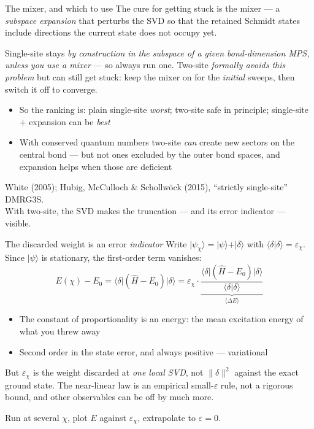 \documentclass[aspectratio=169,10pt]{beamer}
\newcommand{\warnbox}[1]{%
  \begin{tcolorbox}[colback=palewarm,colframe=warm,title={\bfseries A trap to avoid}]
  #1
  \end{tcolorbox}}
\newcommand{\ket}[1]{\vert #1\rangle}
\newcommand{\braket}[2]{\langle #1\vert #2\rangle}
\newcommand{\element}[3]{\langle #1\vert #2\vert #3\rangle}
\newcommand{\hH}{\hat{H}}
\begin{document}
\begin{frame}{The mixer, and which to use}
  The cure for getting stuck is the \alert{mixer} --- a \emph{subspace expansion} that perturbs the SVD so that the
  retained Schmidt states include directions the current state does not occupy yet.
  \begin{tcolorbox}[colback=paleteal,colframe=teal,title={\bfseries In practice},
      fonttitle=\bfseries\small,boxsep=2pt,left=6pt,right=6pt,top=3pt,bottom=3pt]
    \small Single-site stays \emph{by construction in the subspace of a given bond-dimension MPS, unless you use a
    mixer} --- so always run one. Two-site \emph{formally avoids this problem} but can still get stuck: keep the mixer on for the \emph{initial} sweeps, then switch it off to converge.
  \end{tcolorbox}
  \begin{itemize}
    \item So the ranking is: plain single-site \emph{worst}; two-site safe in principle; single-site $+$ expansion can be \emph{best}
    \item With conserved quantum numbers two-site \emph{can} create new sectors on the central bond --- but not ones
          excluded by the \alert{outer} bond spaces, and expansion helps when those are deficient
  \end{itemize}
  \vspace{0.2em}
  \centering\scriptsize White (2005); Hubig, McCulloch \& Schollw\"ock (2015), ``strictly single-site'' DMRG3S.\\[2pt]
  \normalsize\alert{With two-site, the SVD makes the truncation --- and its error indicator --- visible.}
\end{frame}

\begin{frame}{The discarded weight is an error \emph{indicator}}
  Write $\ket{\psi_\chi}=\ket\psi+\ket\delta$ with $\braket\delta\delta=\varepsilon_\chi$. Since $\ket\psi$ is stationary, the first-order term vanishes:
  \[
    E(\chi)-E_0=\element{\delta}{(\hH-E_0)}{\delta}
    =\varepsilon_\chi\cdot\underbrace{\frac{\element{\delta}{(\hH-E_0)}{\delta}}{\braket\delta\delta}}_{\textstyle\langle\Delta E\rangle}
  \]
  \begin{itemize}
    \item The constant of proportionality is \alert{an energy}: the mean excitation energy of what you threw away
    \item Second order in the state error, and always \alert{positive} --- variational
  \end{itemize}
  \warnbox{\small But $\varepsilon_\chi$ is the weight discarded at \emph{one local SVD}, not $\|\delta\|^2$ against the
  exact ground state. The near-linear law is an empirical small-$\varepsilon$ rule, \alert{not a rigorous bound}, and
  other observables can be off by much more.}
  \centering\alert{Run at several $\chi$, plot $E$ against $\varepsilon_\chi$, extrapolate to $\varepsilon=0$.}
\end{frame}
\end{document}
